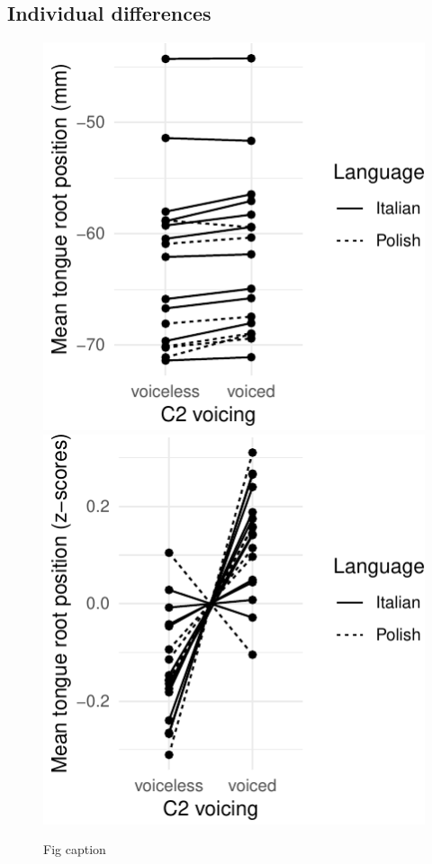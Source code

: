 \documentclass[12pt,]{article}
\begin{document}
\hypertarget{individual-differences}{%
\subsection{Individual differences}\label{individual-differences}}

\begin{figure}

{\centering \includegraphics[width=.49\linewidth]{2018-tra_files/figure-latex/trp-voicing-plot-1} \includegraphics[width=.49\linewidth]{2018-tra_files/figure-latex/trp-voicing-plot-2} 

}

\caption{Fig caption}\label{f:trp-voicing-plot}
\end{figure}
\end{document}
